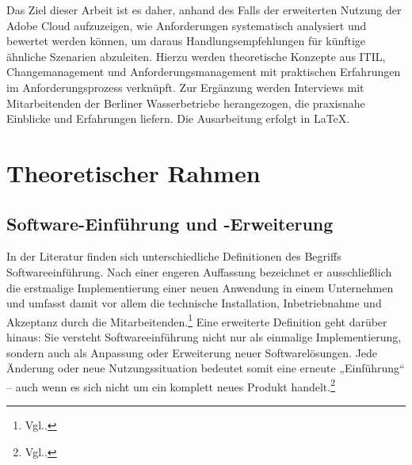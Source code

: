 \documentclass[
    12pt, 
    a4paper,
    ]{scrartcl} %
\begin{document}
Das Ziel dieser Arbeit ist es daher, anhand des Falls der erweiterten Nutzung der Adobe Cloud aufzuzeigen, wie Anforderungen systematisch analysiert und bewertet werden können, um daraus Handlungsempfehlungen für künftige ähnliche Szenarien abzuleiten. Hierzu werden theoretische Konzepte aus ITIL, Changemanagement und Anforderungsmanagement mit praktischen Erfahrungen im Anforderungsprozess verknüpft. Zur Ergänzung werden Interviews mit Mitarbeitenden der Berliner Wasserbetriebe herangezogen, die praxisnahe Einblicke und Erfahrungen liefern. Die Ausarbeitung erfolgt in LaTeX.

\section{Theoretischer Rahmen}
\subsection{Software-Einführung und -Erweiterung}
In der Literatur finden sich unterschiedliche Definitionen des Begriffs Softwareeinführung. Nach einer engeren Auffassung bezeichnet er ausschließlich die erstmalige Implementierung einer neuen Anwendung in einem Unternehmen und umfasst damit vor allem die technische Installation, Inbetriebnahme und Akzeptanz durch die Mitarbeitenden.\footnote{Vgl.\cite{papershift2022}.} 
Eine erweiterte Definition geht darüber hinaus: Sie versteht Softwareeinführung nicht nur als einmalige Implementierung, sondern auch als Anpassung oder Erweiterung neuer Softwarelösungen. Jede Änderung oder neue Nutzungssituation bedeutet somit eine erneute „Einführung“ – auch wenn es sich nicht um ein komplett neues Produkt handelt.\footnote{Vgl.\cite{pureconsultant2023}.}
\end{document}
